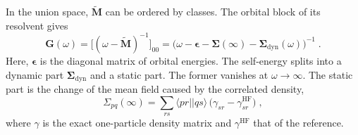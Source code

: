 \documentclass[aip,jcp,reprint,noshowkeys,superscriptaddress]{revtex4-2}
\theoremstyle{plain}
\theoremstyle{definition}
\theoremstyle{remark}
\begin{document}
In the union space, $\tilde{\mathbf{M}}$ can be ordered by classes. The orbital block of its resolvent gives
\begin{equation}
\mathbf{G}(\omega)=\big[(\omega-\tilde{\mathbf{M}})^{-1}\big]_{00}=\big(\omega-\pmb\epsilon-\pmb\Sigma(\infty)-\pmb\Sigma_{\mathrm{dyn}}(\omega)\big)^{-1} \;.
\label{eq:si:resolvent}
\end{equation}
Here, $\pmb{\epsilon}$ is the diagonal matrix of orbital energies. The self-energy splits into a dynamic part $\pmb{\Sigma}_{\mathrm{dyn}}$ and a static part. The former vanishes at $\omega \to \infty$. The static part is the change of the mean field caused by the correlated density,\cite{Schirmer_1983,Schirmer_1998}
\begin{equation}
\Sigma_{pq}(\infty)=\sum_{rs}\langle pr||qs\rangle\,
\big(\gamma_{sr}-\gamma^{\mathrm{HF}}_{sr}\big) \;,
\label{eq:si:sinf}
\end{equation}
where $\gamma$ is the exact one-particle density matrix and $\gamma^{\mathrm{HF}}$ that of the reference.
\end{document}
